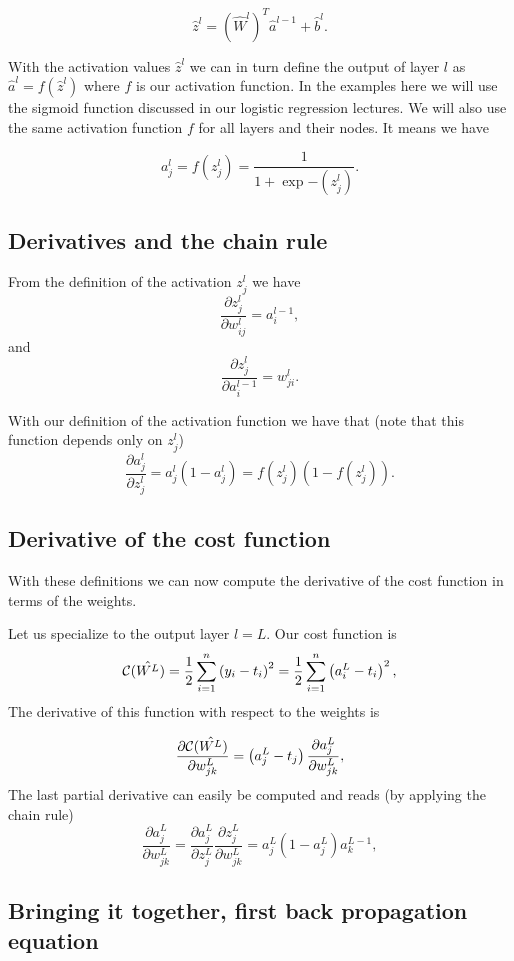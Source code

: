 \documentclass[%
oneside,                 %
final,                   %
10pt]{article}
\begin{document}
\[
\hat{z}^l = \left(\hat{W}^l\right)^T\hat{a}^{l-1}+\hat{b}^l.
\]

With the activation values $\hat{z}^l$ we can in turn define the
output of layer $l$ as $\hat{a}^l = f(\hat{z}^l)$ where $f$ is our
activation function. In the examples here we will use the sigmoid
function discussed in our logistic regression lectures. We will also use the same activation function $f$ for all layers
and their nodes.  It means we have

\[
a_j^l = f(z_j^l) = \frac{1}{1+\exp{-(z_j^l)}}.
\]

\subsection{Derivatives and the chain rule}

From the definition of the activation $z_j^l$ we have
\[
\frac{\partial z_j^l}{\partial w_{ij}^l} = a_i^{l-1},
\]
and
\[
\frac{\partial z_j^l}{\partial a_i^{l-1}} = w_{ji}^l. 
\]

With our definition of the activation function we have that (note that this function depends only on $z_j^l$)
\[
\frac{\partial a_j^l}{\partial z_j^{l}} = a_j^l(1-a_j^l)=f(z_j^l)(1-f(z_j^l)). 
\]

\subsection{Derivative of the cost function}

With these definitions we can now compute the derivative of the cost function in terms of the weights.

Let us specialize to the output layer $l=L$. Our cost function is
\[
{\cal C}(\hat{W^L})  =  \frac{1}{2}\sum_{i=1}^n\left(y_i - t_i\right)^2=\frac{1}{2}\sum_{i=1}^n\left(a_i^L - t_i\right)^2, 
\]
The derivative of this function with respect to the weights is

\[
\frac{\partial{\cal C}(\hat{W^L})}{\partial w_{jk}^L}  =  \left(a_j^L - t_j\right)\frac{\partial a_j^L}{\partial w_{jk}^{L}}, 
\]
The last partial derivative can easily be computed and reads (by applying the chain rule)
\[
\frac{\partial a_j^L}{\partial w_{jk}^{L}} = \frac{\partial a_j^L}{\partial z_{j}^{L}}\frac{\partial z_j^L}{\partial w_{jk}^{L}}=a_j^L(1-a_j^L)a_k^{L-1},  
\]

\subsection{Bringing it together, first back propagation equation}
\end{document}
